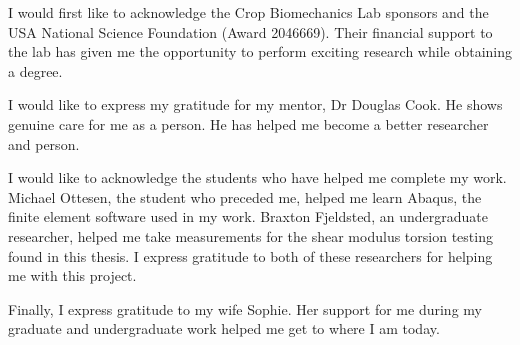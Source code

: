 \begin{acknowledgments}
    I would first like to acknowledge the Crop Biomechanics Lab sponsors and the USA National Science Foundation (Award 2046669). Their financial support to the lab has given me the opportunity to perform exciting research while obtaining a degree. 

    I would like to express my gratitude for my mentor, Dr Douglas Cook. He shows genuine care for me as a person. He has helped me become a better researcher and person.

    I would like to acknowledge the students who have helped me complete my work. Michael Ottesen, the student who preceded me, helped me learn Abaqus, the finite element software used in my work. Braxton Fjeldsted, an undergraduate researcher, helped me take measurements for the shear modulus torsion testing found in this thesis. I express gratitude to both of these researchers for helping me with this project.

    Finally, I express gratitude to my wife Sophie. Her support for me during my graduate and undergraduate work helped me get to where I am today.
\end{acknowledgments}
